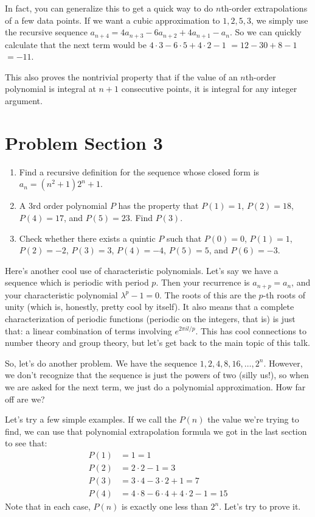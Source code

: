 \documentclass[12pt,letterpaper]{article}
\begin{document}
In fact, you can generalize this to get a quick way to do $n$th-order extrapolations
of a few data points. If we want a cubic approximation to $1, 2, 5, 3$, we simply
use the recursive sequence $a_{n+4} = 4a_{n+3} - 6a_{n+2} + 4a_{n+1} - a_n$. So we
can quickly calculate that the next term would be $4 \cdot 3 - 6 \cdot 5 + 4 \cdot
2 - 1$ $= 12 - 30 + 8 - 1$ $=-11$.

This also proves the nontrivial property that if the value of an
$n$th-order polynomial is integral at $n+1$ consecutive points, it is integral
for any integer argument.

\section{Problem Section 3}
\begin{enumerate}
  \item Find a recursive definition for the sequence whose closed form is $a_n =
  (n^2 + 1) 2^n + 1$.
  \item A 3rd order polynomial $P$ has the property that $P(1) = 1$, $P(2) = 18$,
  $P(4) = 17$, and $P(5) = 23$. Find $P(3)$.
  \item Check whether there exists a quintic $P$ such that $P(0) = 0$, $P(1) = 1$, $P(2) = -2$,
  $P(3) = 3$, $P(4) = -4$, $P(5) = 5$, and $P(6) = -3$.
\end{enumerate}

Here's another cool use of characteristic polynomials. Let's say we have a
sequence which is periodic with period $p$. Then your recurrence is
$a_{n+p} = a_n$, and your characteristic polynomial $\lambda^p-1=0$.
The roots of this are the $p$-th roots of unity (which is, honestly,
pretty cool by itself). It also means that a complete
characterization of periodic functions (periodic on the integers, that
is) is just that: a linear combination of terms involving $e^{2\pi il/p}$. This has
cool connections to number theory and group theory, but let's get back
to the main topic of this talk.

So, let's do another problem. We have the sequence $1, 2, 4, 8, 16, \ldots, 2^n$. However,
we don't recognize that the sequence is just the powers of two (silly us!), so when we are
asked for the next term, we just do a polynomial approximation. How
far off are we?

Let's try a few simple examples. If we call the $P(n)$ the value we're trying to
find, we can use that polynomial extrapolation formula we got in the last
section to see that:
\begin{align*}
P(1) &= 1 = 1 \\
P(2) &= 2\cdot2-1 = 3 \\
P(3) &= 3\cdot4-3\cdot2+1 = 7 \\
P(4) &= 4\cdot8-6\cdot4+4\cdot2-1 = 15
\end{align*}
Note that in each case, $P(n)$ is exactly one less than $2^n$. Let's try to prove it.
\end{document}
